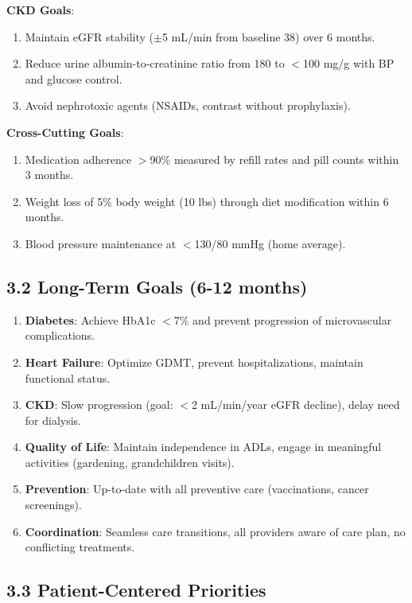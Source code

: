\documentclass[11pt,letterpaper]{article}
\begin{document}
\textbf{CKD Goals}:
\begin{enumerate}[leftmargin=*]
    \item Maintain eGFR stability ($\pm$5 mL/min from baseline 38) over 6 months.
    \item Reduce urine albumin-to-creatinine ratio from 180 to $<$100 mg/g with BP and glucose control.
    \item Avoid nephrotoxic agents (NSAIDs, contrast without prophylaxis).
\end{enumerate}

\textbf{Cross-Cutting Goals}:
\begin{enumerate}[leftmargin=*]
    \item Medication adherence $>$90\% measured by refill rates and pill counts within 3 months.
    \item Weight loss of 5\% body weight (10 lbs) through diet modification within 6 months.
    \item Blood pressure maintenance at $<$130/80 mmHg (home average).
\end{enumerate}

\subsection*{3.2 Long-Term Goals (6-12 months)}

\begin{enumerate}[leftmargin=*]
    \item \textbf{Diabetes}: Achieve HbA1c $<$7\% and prevent progression of microvascular complications.
    \item \textbf{Heart Failure}: Optimize GDMT, prevent hospitalizations, maintain functional status.
    \item \textbf{CKD}: Slow progression (goal: $<$2 mL/min/year eGFR decline), delay need for dialysis.
    \item \textbf{Quality of Life}: Maintain independence in ADLs, engage in meaningful activities (gardening, grandchildren visits).
    \item \textbf{Prevention}: Up-to-date with all preventive care (vaccinations, cancer screenings).
    \item \textbf{Coordination}: Seamless care transitions, all providers aware of care plan, no conflicting treatments.
\end{enumerate}

\subsection*{3.3 Patient-Centered Priorities}
\end{document}
